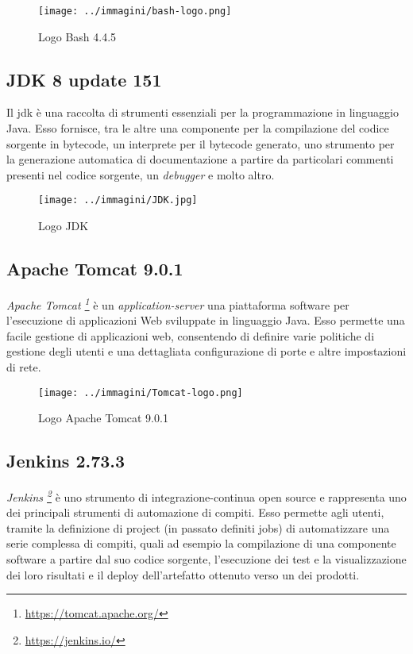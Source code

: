 \begin{figure}[H]
    \capstart
    \centering
    \texttt{[image: ../immagini/bash-logo.png]}
    \caption{Logo Bash 4.4.5}
\end{figure}

\subsection{JDK 8 update 151}

Il \gls{jdk} è una raccolta di strumenti essenziali per la programmazione in linguaggio Java. Esso fornisce, tra le altre una componente per la compilazione del codice sorgente in \gls{bytecode}, un interprete per il \gls{bytecode} generato, uno strumento per la generazione automatica di documentazione a partire da particolari commenti presenti nel codice sorgente, un \textit{\gls{debugger}} e molto altro.

\begin{figure}[H]
    \capstart
    \centering
    \texttt{[image: ../immagini/JDK.jpg]}
    \caption{Logo JDK}
\end{figure}

\subsection{Apache Tomcat 9.0.1}

\textit{Apache Tomcat \footnote{\url{https://tomcat.apache.org/}}} è un \textit{\gls{application-server}} una piattaforma software per l'esecuzione di applicazioni Web sviluppate in linguaggio Java. Esso permette una facile gestione di applicazioni web, consentendo di definire varie politiche di gestione degli utenti e una dettagliata configurazione di porte e altre impostazioni di rete.

\begin{figure}[H]
    \capstart
    \centering
    \texttt{[image: ../immagini/Tomcat-logo.png]}
    \caption{Logo Apache Tomcat 9.0.1}
\end{figure}

\subsection{Jenkins 2.73.3}

\textit{Jenkins \footnote{\url{https://jenkins.io/}}} è uno strumento di \gls{integrazione-continua} open source e rappresenta uno dei principali strumenti di automazione di compiti. Esso permette agli utenti, tramite la definizione di \gls{project} (in passato definiti jobs) di automatizzare una serie complessa di compiti, quali ad esempio la compilazione di una componente software a partire dal suo codice sorgente, l'esecuzione dei test e la visualizzazione dei loro risultati e il \gls{deploy} dell'\gls{artefatto} ottenuto verso un  dei prodotti.\\

